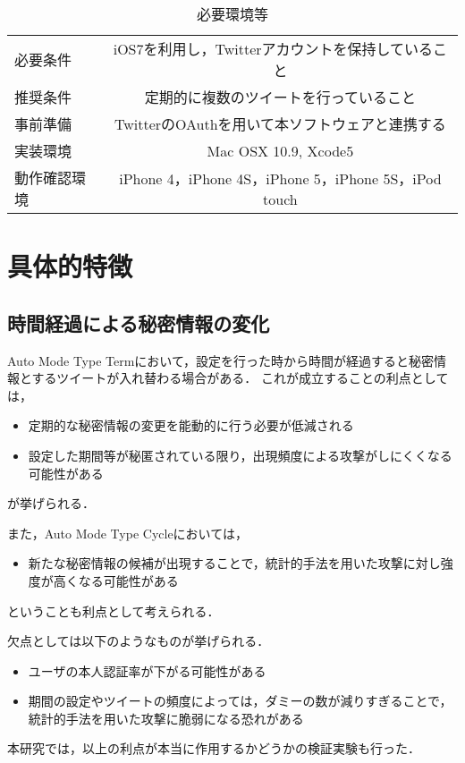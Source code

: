 \begin{table}[htpb]
  \begin{center}
    \caption{必要環境等}
    \label{tbl:requirements}
    \vspace{4mm}
    \begin{tabular}{l||c}
    必要条件 & iOS7を利用し，Twitterアカウントを保持していること \\
    推奨条件 & 定期的に複数のツイートを行っていること \\
    事前準備 & TwitterのOAuthを用いて本ソフトウェアと連携する \\
    実装環境 & Mac OSX 10.9, Xcode5 \\
    動作確認環境 & iPhone 4，iPhone 4S，iPhone 5，iPhone 5S，iPod touch \\
    \end{tabular}
  \end{center}
\end{table}

\section{具体的特徴}\label{sec:feature}
\subsection{時間経過による秘密情報の変化}
Auto Mode Type Termにおいて，設定を行った時から時間が経過すると秘密情報とするツイートが入れ替わる場合がある．
これが成立することの利点としては，
\begin{itemize}
  \item 定期的な秘密情報の変更を能動的に行う必要が低減される
  \item 設定した期間等が秘匿されている限り，出現頻度による攻撃がしにくくなる可能性がある
\end{itemize}
が挙げられる．

また，Auto Mode Type Cycleにおいては，
\begin{itemize}
  \item 新たな秘密情報の候補が出現することで，統計的手法を用いた攻撃に対し強度が高くなる可能性がある
\end{itemize}
ということも利点として考えられる．

欠点としては以下のようなものが挙げられる．
\begin{itemize}
  \item ユーザの本人認証率が下がる可能性がある
  \item 期間の設定やツイートの頻度によっては，ダミーの数が減りすぎることで，統計的手法を用いた攻撃に脆弱になる恐れがある
\end{itemize}

本研究では，以上の利点が本当に作用するかどうかの検証実験も行った．

\newpage

